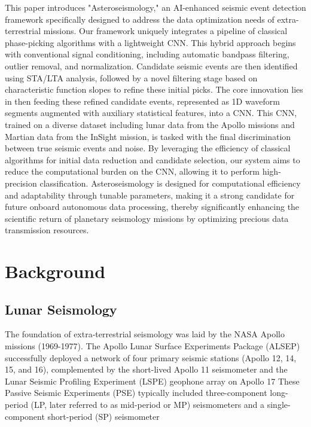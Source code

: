 \documentclass[conference]{IEEEtran}
\begin{document}
    This paper introduces "Asteroseismology," an AI-enhanced seismic event detection framework specifically designed to
    address the data optimization needs of extra-terrestrial missions. Our framework uniquely integrates a pipeline of
    classical phase-picking algorithms with a lightweight CNN. This hybrid approach begins with conventional signal
    conditioning, including automatic bandpass filtering, outlier removal, and normalization. Candidate seismic events
    are then identified using STA/LTA analysis, followed by a novel filtering stage based on characteristic function
    slopes to refine these initial picks. The core innovation lies in then feeding these refined candidate events,
    represented as 1D waveform segments augmented with auxiliary statistical features, into a CNN. This CNN, trained on
    a diverse dataset including lunar data from the Apollo missions and Martian data from the InSight mission, is tasked
    with the final discrimination between true seismic events and noise. By leveraging the efficiency of classical
    algorithms for initial data reduction and candidate selection, our system aims to reduce the computational burden on
    the CNN, allowing it to perform high-precision classification. Asteroseismology is designed for computational
    efficiency and adaptability through tunable parameters, making it a strong candidate for future onboard autonomous
    data processing, thereby significantly enhancing the scientific return of planetary seismology missions by
    optimizing precious data transmission resources.

\section{Background}
    \subsection{Lunar Seismology}
        The foundation of extra-terrestrial seismology was laid by the NASA Apollo missions (1969-1977). The Apollo
        Lunar Surface Experiments Package (ALSEP) successfully deployed a network of four primary seismic stations
        (Apollo 12, 14, 15, and 16), complemented by the short-lived Apollo 11 seismometer and the Lunar Seismic
        Profiling Experiment (LSPE) geophone array on Apollo 17 \cite{Nakamura1982, Lognonne2005, Nunn2020}
        These Passive Seismic Experiments (PSE) typically included three-component long-period (LP, later referred to as
        mid-period or MP) seismometers and a single-component short-period (SP) seismometer
        \cite{Nunn2020}%
\end{document}
